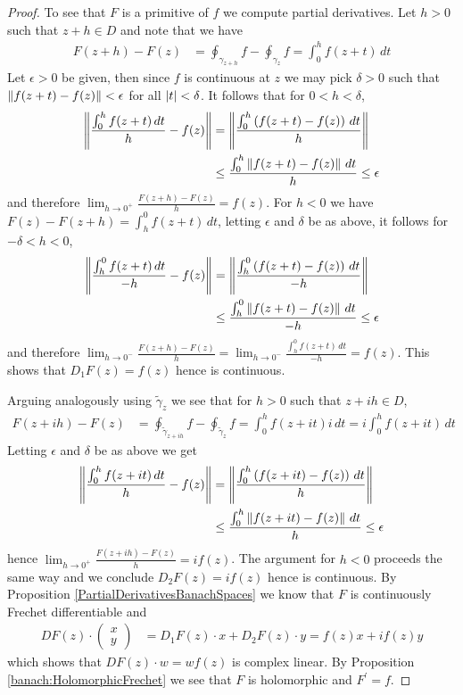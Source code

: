 \begin{proof}
  To see that $F$ is a primitive of $f$ we compute partial derivatives.   Let $h>0$ such that $z+h \in D$ and note that we have
  \begin{align*}
    F(z+h) - F(z) &= \oint_{\gamma_{z+h}} f -  \oint_{\gamma_z} f = \int_0^h f(z + t) \, dt
  \end{align*}
  Let $\epsilon>0$ be given, then since $f$ is continuous at $z$ we may pick $\delta>0$ such that $\left \lVert f(z+t) - f(z) \right \rVert < \epsilon$ for all $\left \vert t \right \vert < \delta$.   It follows that for $0 < h < \delta$,
  \begin{align*}
    \left \lVert \frac{\int_0^h f(z + t) \, dt }{h} - f(z) \right \rVert &= \left \lVert \frac{\int_0^h \left( f(z + t) - f(z) \right) \, dt}{h} \right \rVert \\
    &\leq \frac{\int_0^h \left \lVert  f(z + t) - f(z)  \right \rVert \, dt}{h} \leq \epsilon
  \end{align*}
  and therefore $\lim_{h \to 0^+} \frac{F(z+h) - F(z)}{h} = f(z)$.    For $h < 0$ we have $F(z) - F(z+h) = \int_h^0 f(z+t) \, dt$, letting $\epsilon$ and $\delta$ be as above, it follows for $-\delta < h < 0$,
 \begin{align*}
    \left \lVert \frac{\int_h^0 f(z + t) \, dt }{-h} - f(z) \right \rVert &= \left \lVert \frac{\int_h^0 \left( f(z + t) - f(z) \right) \, dt}{-h} \right \rVert \\
    &\leq \frac{\int_h^0 \left \lVert  f(z + t) - f(z)  \right \rVert \, dt}{-h} \leq \epsilon
  \end{align*}
  and therefore $\lim_{h \to 0^-} \frac{F(z+h) - F(z)}{h} = \lim_{h \to 0^-} \frac{\int_h^0 f(z + t) \, dt }{-h}  = f(z)$.   This shows that $D_1 F(z) = f(z)$ hence is continuous.

Arguing analogously using $\tilde{\gamma}_z$ we see that for $h>0$ such that $z + ih \in D$,
  \begin{align*}
    F(z+ih) - F(z) &= \oint_{\tilde{\gamma}_{z+ih}} f -  \oint_{\tilde{\gamma}_z} f = \int_0^h f(z + i t) i \, dt = i \int_0^h f(z + i t) \, dt
  \end{align*}
Letting $\epsilon$ and $\delta$ be as above we get 
 \begin{align*}
    \left \lVert \frac{\int_0^h f(z + it) \, dt }{h} - f(z) \right \rVert &= \left \lVert \frac{\int_0^h \left( f(z + it) - f(z) \right) \, dt}{h} \right \rVert \\
    &\leq \frac{\int_0^h \left \lVert  f(z +i t) - f(z)  \right \rVert \, dt}{h} \leq \epsilon
  \end{align*}
  hence $\lim_{h \to 0^+} \frac{F(z+ih) - F(z)}{h} = i f(z)$.   The argument for $h<0$ proceeds the same way and we conclude $D_2 F(z) = i f(z)$ hence is continuous.   By Proposition \ref{PartialDerivativesBanachSpaces} we know that $F$ is continuously Frechet differentiable and
  \begin{align*}
    DF(z) \cdot \begin{pmatrix} x \\ y \end{pmatrix} &= D_1F(z) \cdot x + D_2 F(z) \cdot y = f(z) x + i f(z) y
  \end{align*}
  which shows that $DF(z) \cdot w= w f(z)$ is complex linear.   By Proposition \ref{banach:HolomorphicFrechet} we see that $F$ is holomorphic and $F^\prime = f$.
\end{proof}

